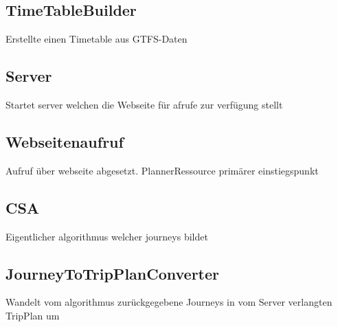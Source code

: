 \subsection{TimeTableBuilder}
Erstellte einen Timetable aus GTFS-Daten
\subsection{Server}
Startet server welchen die Webseite für afrufe zur verfügung stellt
\subsection{Webseitenaufruf}
Aufruf über webseite abgesetzt. PlannerRessource primärer einstiegspunkt
\subsection{CSA}
Eigentlicher algorithmus welcher journeys bildet
\subsection{JourneyToTripPlanConverter}
Wandelt vom algorithmus zurückgegebene Journeys in vom Server verlangten TripPlan um